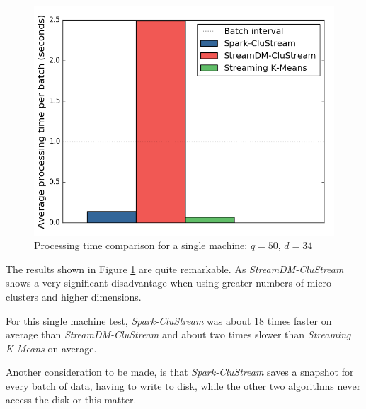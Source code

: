 \begin{figure}[h!]
 \centering
 \includegraphics[scale=0.47]{./styles/singlemachine.png}
 \caption{Processing time comparison for a single machine: $q=50$, $d=34$}
 \label{fig:singlemachine}
\end{figure}

The results shown in Figure \ref{fig:singlemachine} are quite remarkable. As \textit{StreamDM-CluStream} shows a very significant disadvantage when using greater numbers of micro-clusters and higher dimensions.

For this single machine test, \textit{Spark-CluStream} was about 18 times faster on average than \textit{StreamDM-CluStream} and about two times slower than \textit{Streaming K-Means} on average.

Another consideration to be made, is that  \textit{Spark-CluStream} saves a snapshot for every batch of data, having to write to disk, while the other two algorithms never access the disk or this matter.


